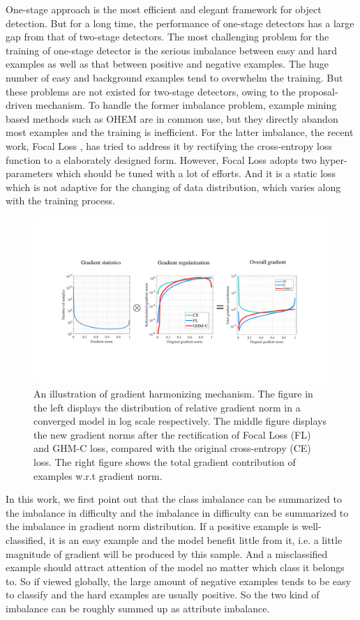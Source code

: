 \documentclass[letterpaper]{article} %
\begin{document}
One-stage approach is the most efficient and elegant framework for object detection. But for a long time, the performance of one-stage detectors has a large gap from that of two-stage detectors. The most challenging problem for the training of one-stage detector is the serious imbalance between easy and hard examples as well as that between positive and negative examples. The huge number of easy and background examples tend to overwhelm the training. But these problems are not existed for two-stage detectors, owing to the proposal-driven mechanism. To handle the former imbalance problem, example mining based methods such as OHEM \cite{ohem} are in common use, but they directly abandon most examples and the training is inefficient. For the latter imbalance, the recent work, Focal Loss \cite{focal}, has tried to address it by rectifying the cross-entropy loss function to a elaborately designed form. However, Focal Loss adopts two hyper-parameters which should be tuned with a lot of efforts. And it is a static loss which is not adaptive for the changing of data distribution, which varies along with the training process.

\begin{figure}[t]
\centering
\includegraphics[width=1\linewidth]{figs/aaai19lbyfig1}
\caption{An illustration of gradient harmonizing mechanism. The figure in the left displays the distribution of relative gradient norm in a converged model in log scale respectively. The middle figure displays the new gradient norms after the rectification of Focal Loss (FL) and GHM-C loss, compared with the original cross-entropy (CE) loss. The right figure shows the total gradient contribution of examples w.r.t gradient norm.}
\label{fig:method}
\end{figure}

In this work, we first point out that the class imbalance can be summarized to the imbalance in difficulty and the imbalance in difficulty can be summarized to the imbalance in gradient norm distribution. If a positive example is well-classified, it is an easy example and the model benefit little from it, i.e. a little magnitude of gradient will be produced by this sample. And a misclassified example should attract attention of the model no matter which class it belongs to. So if viewed globally, the large amount of negative examples tends to be easy to classify and the hard examples are usually positive. So the two kind of imbalance can be roughly summed up as attribute imbalance.
\end{document}
